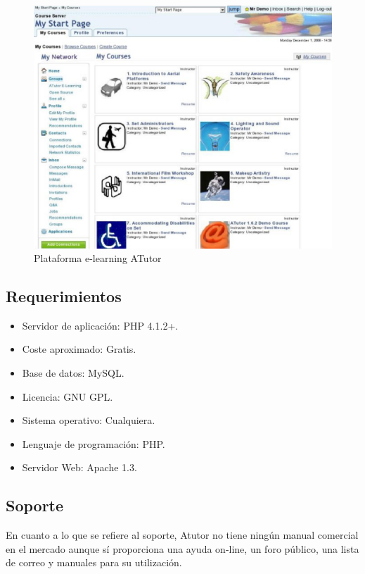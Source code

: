 \begin{figure}[h]
	\includegraphics[width=\textwidth]{./img/c2-atutor.eps}
	\caption{Plataforma e-learning ATutor}
\end{figure}

\subsection{Requerimientos}

\begin{itemize}
	\item Servidor de aplicación: PHP 4.1.2+. 
	\item Coste aproximado: Gratis.
	\item Base de datos: MySQL.
	\item Licencia: GNU GPL.
	\item Sistema operativo: Cualquiera. 
	\item Lenguaje de programación: PHP. 
	\item Servidor Web: Apache 1.3.
\end{itemize}

\subsection{Soporte}

En cuanto a lo que se refiere al soporte, Atutor no tiene ningún manual comercial en el mercado aunque sí proporciona una ayuda on-line, un foro público, una lista de correo y manuales para su utilización.


